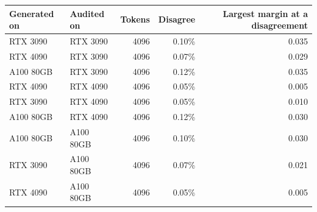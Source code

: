 \begin{tabular}{@{}llrrr@{}}
\toprule
\textbf{Generated on} & \textbf{Audited on} & \textbf{Tokens} & \textbf{Disagree} & \textbf{Largest margin at a disagreement} \\
\midrule
RTX 3090 & RTX 3090 & 4096 & 0.10\% & 0.035 \\
RTX 4090 & RTX 3090 & 4096 & 0.07\% & 0.029 \\
A100 80GB & RTX 3090 & 4096 & 0.12\% & 0.035 \\
RTX 4090 & RTX 4090 & 4096 & 0.05\% & 0.005 \\
RTX 3090 & RTX 4090 & 4096 & 0.05\% & 0.010 \\
A100 80GB & RTX 4090 & 4096 & 0.12\% & 0.030 \\
A100 80GB & A100 80GB & 4096 & 0.10\% & 0.030 \\
RTX 3090 & A100 80GB & 4096 & 0.07\% & 0.021 \\
RTX 4090 & A100 80GB & 4096 & 0.05\% & 0.005 \\
\bottomrule
\end{tabular}
